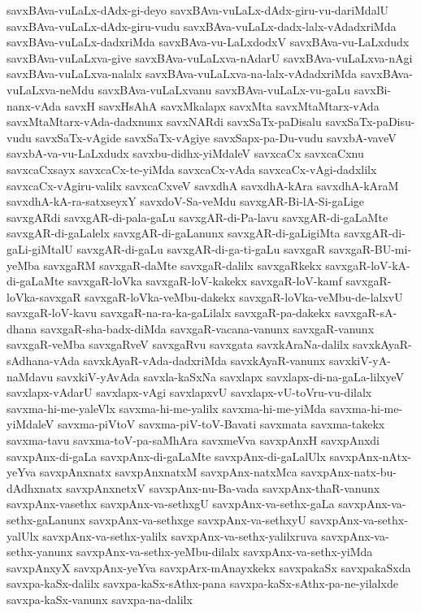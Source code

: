{savxBAva-vuLaLx-dAdx-gi-deyo
savxBAva-vuLaLx-dAdx-giru-vu-dariMdalU
savxBAva-vuLaLx-dAdx-giru-vudu
savxBAva-vuLaLx-dadx-lalx-vAdadxriMda
savxBAva-vuLaLx-dadxriMda
savxBAva-vu-LaLxdodxV
savxBAva-vu-LaLxdudx
savxBAva-vuLaLxva-give
savxBAva-vuLaLxva-nAdarU
savxBAva-vuLaLxva-nAgi
savxBAva-vuLaLxva-nalalx
savxBAva-vuLaLxva-na-lalx-vAdadxriMda
savxBAva-vuLaLxva-neMdu
savxBAva-vuLaLxvanu
savxBAva-vuLaLx-vu-gaLu
savxBi-nanx-vAda
savxH
savxHsAhA
savxMkalapx
savxMta
savxMtaMtarx-vAda
savxMtaMtarx-vAda-dadxnunx
savxNARdi
savxSaTx-paDisalu
savxSaTx-paDisu-vudu
savxSaTx-vAgide
savxSaTx-vAgiye
savxSapx-pa-Du-vudu
savxbA-vaveV
savxbA-va-vu-LaLxdudx
savxbu-didhx-yiMdaleV
savxcaCx
savxcaCxnu
savxcaCxsayx
savxcaCx-te-yiMda
savxcaCx-vAda
savxcaCx-vAgi-dadxlilx
savxcaCx-vAgiru-valilx
savxcaCxveV
savxdhA
savxdhA-kAra
savxdhA-kAraM
savxdhA-kA-ra-satxseyxY
savxdoV-Sa-veMdu
savxgAR-Bi-lA-Si-gaLige
savxgARdi
savxgAR-di-pala-gaLu
savxgAR-di-Pa-lavu
savxgAR-di-gaLaMte
savxgAR-di-gaLalelx
savxgAR-di-gaLanunx
savxgAR-di-gaLigiMta
savxgAR-di-gaLi-giMtalU
savxgAR-di-gaLu
savxgAR-di-ga-ti-gaLu
savxgaR
savxgaR-BU-mi-yeMba
savxgaRM
savxgaR-daMte
savxgaR-dalilx
savxgaRkekx
savxgaR-loV-kA-di-gaLaMte
savxgaR-loVka
savxgaR-loV-kakekx
savxgaR-loV-kamf
savxgaR-loVka-savxgaR
savxgaR-loVka-veMbu-dakekx
savxgaR-loVka-veMbu-de-lalxvU
savxgaR-loV-kavu
savxgaR-na-ra-ka-gaLilalx
savxgaR-pa-dakekx
savxgaR-sA-dhana
savxgaR-sha-badx-diMda
savxgaR-vacana-vanunx
savxgaR-vanunx
savxgaR-veMba
savxgaRveV
savxgaRvu
savxgata
savxkAraNa-dalilx
savxkAyaR-sAdhana-vAda
savxkAyaR-vAda-dadxriMda
savxkAyaR-vanunx
savxkiV-yA-naMdavu
savxkiV-yAvAda
savxla-kaSxNa
savxlapx
savxlapx-di-na-gaLa-lilxyeV
savxlapx-vAdarU
savxlapx-vAgi
savxlapxvU
savxlapx-vU-toVru-vu-dilalx
savxma-hi-me-yaleVlx
savxma-hi-me-yalilx
savxma-hi-me-yiMda
savxma-hi-me-yiMdaleV
savxma-piVtoV
savxma-piV-toV-Bavati
savxmata
savxma-takekx
savxma-tavu
savxma-toV-pa-saMhAra
savxmeVva
savxpAnxH
savxpAnxdi
savxpAnx-di-gaLa
savxpAnx-di-gaLaMte
savxpAnx-di-gaLalUlx
savxpAnx-nAtx-yeYva
savxpAnxnatx
savxpAnxnatxM
savxpAnx-natxMca
savxpAnx-natx-bu-dAdhxnatx
savxpAnxnetxV
savxpAnx-nu-Ba-vada
savxpAnx-thaR-vanunx
savxpAnx-vasethx
savxpAnx-va-sethxgU
savxpAnx-va-sethx-gaLa
savxpAnx-va-sethx-gaLanunx
savxpAnx-va-sethxge
savxpAnx-va-sethxyU
savxpAnx-va-sethx-yalUlx
savxpAnx-va-sethx-yalilx
savxpAnx-va-sethx-yalilxruva
savxpAnx-va-sethx-yanunx
savxpAnx-va-sethx-yeMbu-dilalx
savxpAnx-va-sethx-yiMda
savxpAnxyX
savxpAnx-yeYva
savxpArx-mAnayxkekx
savxpakaSx
savxpakaSxda
savxpa-kaSx-dalilx
savxpa-kaSx-sAthx-pana
savxpa-kaSx-sAthx-pa-ne-yilalxde
savxpa-kaSx-vanunx
savxpa-na-dalilx
}
